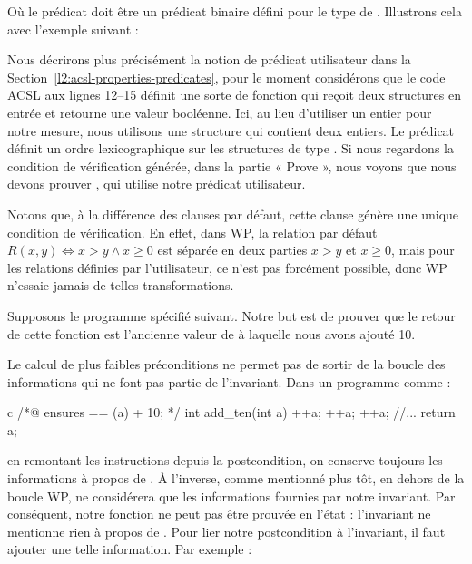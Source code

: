 Où le prédicat  doit être un prédicat binaire défini pour
le type de . Illustrons cela avec l'exemple suivant :




Nous décrirons plus précisément la notion de prédicat utilisateur dans la
Section~\ref{l2:acsl-properties-predicates}, pour le moment considérons que le
code ACSL aux lignes 12--15 définit une sorte de fonction qui reçoit deux
structures en entrée et retourne une valeur booléenne. Ici, au lieu d'utiliser
un entier pour notre mesure, nous utilisons une structure qui contient deux
entiers. Le prédicat  définit un ordre lexicographique sur
les structures de type . Si nous regardons la condition de
vérification générée, dans la partie « Prove », nous voyons que nous devons
prouver , qui utilise notre prédicat utilisateur.


Notons que, à la différence des clauses  par défaut,
cette clause génère une unique condition de vérification. En effet, dans WP,
la relation par défaut $R(x,y) \Leftrightarrow x > y \wedge x \geq 0$ est
séparée en deux parties $x > y$ et $x \geq 0$, mais pour les relations définies
par l'utilisateur, ce n'est pas forcément possible, donc WP n'essaie jamais de
telles transformations.




Supposons le programme spécifié suivant. Notre but est de prouver que le retour
de cette fonction est l'ancienne valeur de  à laquelle nous avons ajouté 10.






Le calcul de plus faibles préconditions ne permet pas de sortir de la boucle des
informations qui ne font pas partie de l'invariant. Dans un programme comme :
\begin{CodeBlock}{c}
/*@
    ensures \result == \old(a) + 10;
*/
int add_ten(int a){
    ++a;
    ++a;
    ++a;
    //...
    return a;
}
\end{CodeBlock}
en remontant les instructions depuis la postcondition, on conserve toujours les
informations à propos de . À l'inverse, comme mentionné plus tôt, en dehors
de la boucle WP, ne considérera que les informations fournies par notre
invariant. Par conséquent, notre fonction  ne peut pas être prouvée
en l'état : l'invariant ne mentionne rien à propos de . Pour lier notre
postcondition à l'invariant, il faut ajouter une telle information. Par
exemple :



